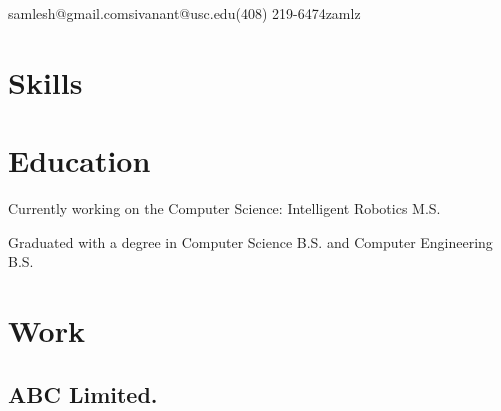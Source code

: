 \documentclass{resume}
\begin{document}
{samlesh@gmail.com}{sivanant@usc.edu}{(408) 219-6474}{zamlz}

\section{Skills}

\section{Education}
Currently working on the Computer Science: Intelligent Robotics M.S.

Graduated with a degree in Computer Science B.S. and Computer Engineering B.S.

\section{Work}
\subsection{ABC Limited.}
\end{document}
